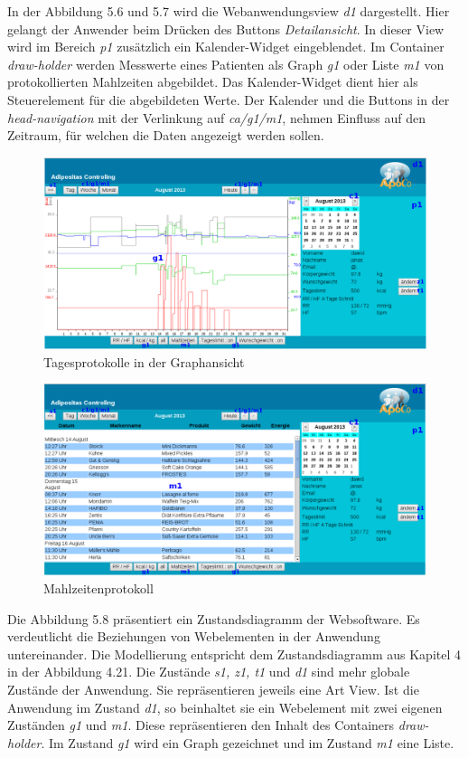 In der Abbildung 5.6 und 5.7 wird die Webanwendungsview \emph{d1} dargestellt.
Hier gelangt der Anwender beim Dr\"ucken des Buttons \emph{Detailansicht}.
In dieser View wird im Bereich \emph{p1} zus\"atzlich ein Kalender-Widget eingeblendet.
Im Container \emph{draw-holder} werden Messwerte eines Patienten als Graph \emph{g1}
oder Liste \emph{m1} von protokollierten Mahlzeiten abgebildet.
Das Kalender-Widget dient hier als Steuerelement f\"ur die abgebildeten Werte.
Der Kalender und die Buttons in der \emph{head-navigation} mit der Verlinkung 
auf \emph{ca/g1/m1},
nehmen Einfluss auf den Zeitraum, f\"ur welchen die Daten angezeigt werden sollen.\\

\begin{figure}[h]
\centering
  \includegraphics[scale=0.25]{screenshots/kapitel5/patient_graph_.png}
  \caption{Tagesprotokolle in der Graphansicht}
\end{figure}

\begin{figure}[h]
\centering
  \includegraphics[scale=0.25]{screenshots/kapitel5/meal_list_.png}
  \caption{Mahlzeitenprotokoll}
\end{figure}

Die Abbildung 5.8 pr\"asentiert ein Zustandsdiagramm der Websoftware.
Es verdeutlicht die Beziehungen von Webelementen in der Anwendung untereinander.
Die Modellierung entspricht dem Zustandsdiagramm aus Kapitel 4 in der Abbildung 4.21.
Die Zust\"ande \emph{s1, z1, t1} und \emph{d1} sind mehr globale Zust\"ande der Anwendung.
Sie repr\"asentieren jeweils eine Art View.
Ist die Anwendung im Zustand \emph{d1}, so beinhaltet sie ein Webelement mit zwei 
eigenen Zust\"anden \emph{g1} und \emph{m1}.
Diese repr\"asentieren den Inhalt des Containers \emph{draw-holder}.
Im Zustand \emph{g1} wird ein Graph gezeichnet und im Zustand \emph{m1} eine Liste.\\



